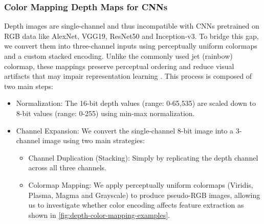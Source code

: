 
\subsubsection{Color Mapping Depth Maps for CNNs}
Depth images are single-channel and thus incompatible with CNNs pretrained on RGB data like AlexNet, VGG19, ResNet50 and Inception-v3. To bridge this gap, we convert them into three-channel inputs using perceptually uniform colormaps and a custom stacked encoding. Unlike the commonly used jet (rainbow) colormap, these mappings preserve perceptual ordering and reduce visual artifacts that may impair representation learning \cite{rainbow_harmful}. This process is composed of two main steps:

\begin{itemize}
    \item Normalization: The 16-bit depth values (range: 0-65,535) are scaled down to 8-bit values (range: 0-255) using min-max normalization.
    \item Channel Expansion: We convert the single-channel 8-bit image into a 3-channel image using two main strategies:
    \begin{itemize}
        \item Channel Duplication (Stacking): Simply by replicating the depth channel across all three channels.
        \item Colormap Mapping: We apply perceptually uniform colormaps (Viridis, Plasma, Magma and Grayscale) to produce pseudo-RGB images, allowing us to investigate whether color encoding affects feature extraction as shown in \autoref{fig:depth-color-mapping-examples}.
    \end{itemize}
\end{itemize}

